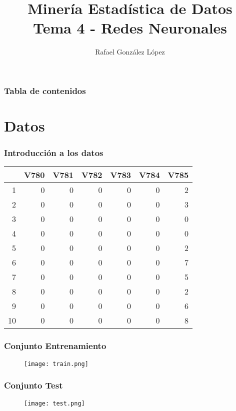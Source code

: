 \documentclass{beamer}
\title{Minería Estadística de Datos\\
Tema 4 - Redes Neuronales	}
\author{Rafael González López 
}
\institute{
Universidad de Sevilla}
\date{}
\theoremstyle{definition}
\begin{document}
\frame{\titlepage}

\begin{frame}
\frametitle{Tabla de contenidos}
\tableofcontents
\end{frame}

\section{Datos}

\begin{frame}
\frametitle{Introducción a los datos}
\begin{table}[ht]
\centering
\begin{tabular}{rrrrrrr}
  \hline
 & V780 & V781 & V782 & V783 & V784 & V785 \\ 
  \hline
1 &   0 &   0 &   0 &   0 &   0 &   2 \\ 
  2 &   0 &   0 &   0 &   0 &   0 &   3 \\ 
  3 &   0 &   0 &   0 &   0 &   0 &   0 \\ 
  4 &   0 &   0 &   0 &   0 &   0 &   0 \\ 
  5 &   0 &   0 &   0 &   0 &   0 &   2 \\ 
  6 &   0 &   0 &   0 &   0 &   0 &   7 \\ 
  7 &   0 &   0 &   0 &   0 &   0 &   5 \\ 
  8 &   0 &   0 &   0 &   0 &   0 &   2 \\ 
  9 &   0 &   0 &   0 &   0 &   0 &   6 \\ 
  10 &   0 &   0 &   0 &   0 &   0 &   8 \\ 
   \hline
\end{tabular}
\end{table}

\end{frame}




\begin{frame}
\frametitle{Conjunto Entrenamiento}
\begin{figure}[h!]
\texttt{[image: train.png]}
\end{figure}
\end{frame}



\begin{frame}
\frametitle{Conjunto Test}
\begin{figure}[h!]
\texttt{[image: test.png]}
\end{figure}
\end{frame}
\end{document}
